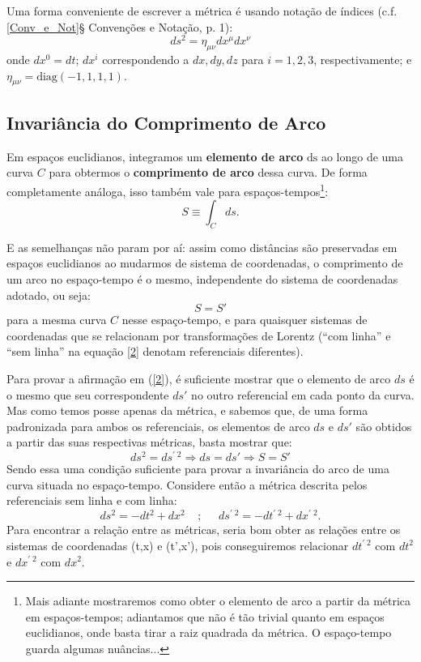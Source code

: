 \documentclass[12pt,a4paper]{article}
\begin{document}
Uma forma conveniente de escrever a métrica é usando notação de índices (c.f. \ref{Conv_e_Not}{§ Convenções e Notação}, p. 1):
\begin{equation*}
  ds^2 = \eta_{\mu\nu}dx^{\mu}dx^{\nu}
\end{equation*}
onde $dx^0 = dt$; $dx^i$ correspondendo a $dx,dy,dz$ para $i=1, 2, 3$, respectivamente; e $\eta_{\mu\nu} = \text{diag}(-1,1,1,1)$.

\subsection{Invariância do Comprimento de Arco}

Em espaços euclidianos, integramos um \textbf{elemento de arco} $\mathrm{ds}$
ao longo de uma curva $C$ para obtermos o \textbf{comprimento de arco} dessa curva. De forma completamente análoga,
isso também vale para espaços-tempos\footnote{Mais adiante mostraremos como obter o elemento de arco a partir da métrica em espaços-tempos; adiantamos que não é tão trivial quanto em espaços euclidianos, onde basta tirar a raiz quadrada da métrica. O espaço-tempo guarda algumas nuâncias...}:
\begin{equation}
  S \equiv \int_{C} ds .
\end{equation}

E as semelhanças não param por aí: assim como distâncias são preservadas em espaços euclidianos ao mudarmos de sistema de coordenadas, o comprimento
de um arco no espaço-tempo é o mesmo, independente do sistema de coordenadas adotado, ou seja:
\begin{equation}
  S = S' 
  \label{2}
\end{equation}
para a mesma curva $C$ nesse espaço-tempo, e para quaisquer sistemas de coordenadas que se relacionam por
transformações de Lorentz (\enquote{com linha} e \enquote{sem linha} na equação \ref{2} denotam referenciais diferentes). 

Para provar a afirmação em (\ref{2}), é suficiente mostrar que o elemento
de arco $ds$ é o mesmo que seu correspondente $ds'$ no outro referencial em cada ponto da curva. Mas como temos posse apenas da métrica,
e sabemos que, de uma forma padronizada para ambos os referenciais, os elementos de arco $ds$ e $ds'$ são obtidos a partir das suas respectivas métricas, basta mostrar que:
\begin{equation*}
  ds^2 = ds^{\prime \; 2} \Rightarrow ds = ds' \Rightarrow S = S'
\end{equation*}
Sendo essa uma condição suficiente para provar a invariância do arco de uma curva situada no
espaço-tempo. 
Considere então a métrica descrita pelos referenciais sem linha e com linha:
\begin{equation}
  ds^2 = -dt^2 + dx^2 \;\;\;\;;\;\;\;\;\; ds^{\prime\; 2} = -dt^{\prime\; 2} + dx^{\prime\; 2}.
  \label{3}
\end{equation}
Para encontrar a relação entre as métricas, seria bom obter as relações entre os sistemas de coordenadas (t,x) e (t',x'),
pois conseguiremos relacionar $dt^{\prime \; 2}$ com $dt^2$ e $dx^{\prime \; 2}$ com $dx^2$.
\end{document}
